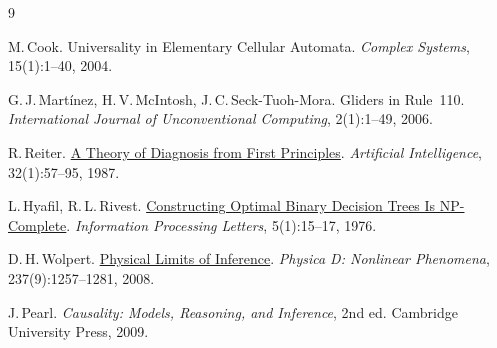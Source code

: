 \documentclass[11pt,a4paper]{article}
\theoremstyle{cleanthm}
\theoremstyle{cleandef}
\begin{document}
\begin{thebibliography}{9}
\small\setlength{\itemsep}{2pt}

M.\,Cook. Universality in Elementary Cellular Automata. \emph{Complex Systems}, 15(1):1--40, 2004.

G.\,J.\,Mart\'inez, H.\,V.\,McIntosh, J.\,C.\,Seck-Tuoh-Mora. Gliders in Rule~110. \emph{International Journal of Unconventional Computing}, 2(1):1--49, 2006.

R.\,Reiter. \href{https://doi.org/10.1016/0004-3702(87)90062-2}{A Theory of Diagnosis from First Principles}. \emph{Artificial Intelligence}, 32(1):57--95, 1987.

L.\,Hyafil, R.\,L.\,Rivest. \href{https://www.sciencedirect.com/science/article/abs/pii/0020019076900958}{Constructing Optimal Binary Decision Trees Is NP-Complete}. \emph{Information Processing Letters}, 5(1):15--17, 1976.

D.\,H.\,Wolpert. \href{https://doi.org/10.1016/j.physd.2008.03.040}{Physical Limits of Inference}. \emph{Physica D: Nonlinear Phenomena}, 237(9):1257--1281, 2008.

J.\,Pearl. \emph{Causality: Models, Reasoning, and Inference}, 2nd ed. Cambridge University Press, 2009.

\end{thebibliography}
\end{document}
